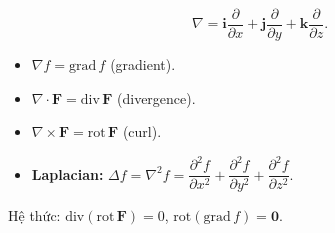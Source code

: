 \documentclass[12pt,a4paper]{article}
\begin{document}
\begin{congthuc}[title={Toán tử Hamilton (nabla) $\nabla$}]
  \[
    \nabla = \mathbf{i}\dfrac{\partial}{\partial x} + \mathbf{j}\dfrac{\partial}{\partial y} + \mathbf{k}\dfrac{\partial}{\partial z}.
  \]
  \begin{itemize}
    \item $\nabla f = \text{grad}\,f$ (gradient).
    \item $\nabla \cdot \mathbf{F} = \text{div}\,\mathbf{F}$ (divergence).
    \item $\nabla \times \mathbf{F} = \text{rot}\,\mathbf{F}$ (curl).
    \item \textbf{Laplacian:} $\Delta f = \nabla^2 f = \dfrac{\partial^2 f}{\partial x^2} + \dfrac{\partial^2 f}{\partial y^2} + \dfrac{\partial^2 f}{\partial z^2}$.
  \end{itemize}
  Hệ thức: $\text{div}(\text{rot}\,\mathbf{F}) = 0$, \;$\text{rot}(\text{grad}\,f) = \mathbf{0}$.
\end{congthuc}
\end{document}
